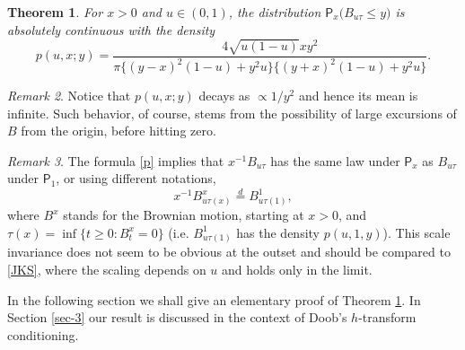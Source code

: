 \documentclass[reqno,10pt]{amsart}
\newtheorem{thm}{Theorem}[section]
\theoremstyle{definition}
\theoremstyle{remark}
\newtheorem{rem}[thm]{Remark}
\numberwithin{equation}{section}
\begin{document}
\begin{thm}\label{thm}
For $x>0$ and $u\in(0,1)$, the distribution ${\mathsf{P}}_x\big(B_{u\tau}\le y\big)$ is absolutely continuous with
the density
\begin{equation}
\label{p}
p(u,x;y)=\frac{
4\sqrt{u(1-u)}xy^2
}{\pi\big\{(y-x)^2(1-u)+y^2 u\big\}\big\{(y+x)^2(1-u)+y^2 u\big\}}.
\end{equation}
\end{thm}

\begin{rem}
Notice that $p(u,x;y)$ decays as $\propto 1/y^2$ and hence its mean is infinite.
Such behavior, of course, stems from the possibility of large excursions of $B$ from the origin, before hitting zero.

\end{rem}

\begin{rem}
The formula \eqref{p} implies that $x^{-1} B_{u\tau}$ has the same law under ${\mathsf{P}}_x$ as $B_{u\tau}$ under ${\mathsf{P}}_1$,
or using different notations,
\begin{equation}\label{scaling}
x^{-1}B^x_{u\tau(x)}\stackrel{d} {=} B^1_{u\tau(1)},
\end{equation}
where $B^x$ stands for the Brownian motion, starting at $x>0$, and $\tau(x)=\inf\{t\ge 0:B^x_t=0\}$
(i.e. $B^1_{u\tau(1)}$ has the density $p(u,1,y)$).
This scale invariance does not seem to be obvious at the outset and
should be compared to \eqref{JKS}, where the  scaling depends on $u$
and holds only in the limit.
\end{rem}

In the following section  we shall give an elementary proof of
Theorem \ref{thm}. In Section \ref{sec-3} our result is discussed in the
context of Doob's $h$-transform conditioning.
\end{document}
